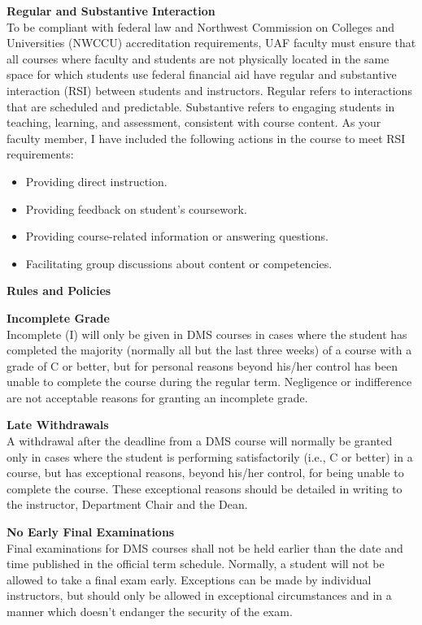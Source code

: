 \documentclass[12pt]{article}
\renewcommand{\emph}[1]{\textsf{\textbf{#1}}}
\newcommand{\localhead}[1]{\par\smallskip\textbf{#1} \smallskip\nobreak\\}%
\def\heading#1{\localhead{\large\emph{#1}}}
\def\subheading#1{\localhead{\emph{#1}}}
\begin{document}
\subheading{Regular and Substantive Interaction}
To be compliant with federal law and Northwest Commission on Colleges and Universities (NWCCU) accreditation requirements, UAF faculty must ensure that all courses where faculty and students are not physically located in the same space for which students use federal financial aid have regular and substantive interaction (RSI) between students and instructors. Regular refers to interactions that are scheduled and predictable. Substantive refers to engaging students in teaching, learning, and assessment, consistent with course content. As your faculty member, I have included the following actions in the course to meet RSI requirements:
\begin{itemize}
\item Providing direct instruction.
\item Providing feedback on student’s coursework.
\item Providing course-related information or answering questions.
\item Facilitating group discussions about content or competencies.
\end{itemize}

\small
\heading{Rules and Policies}
\vskip -20pt

\subheading{Incomplete Grade} 
Incomplete (I) will only be given in
  DMS courses in cases where
  the student has completed the majority (normally all but the last
  three weeks) of a course with a grade of C or better, but for
  personal reasons beyond his/her control has been unable to complete
  the course during the regular term. Negligence or indifference are
  not acceptable reasons for granting an incomplete grade.

\subheading{Late Withdrawals} 
A withdrawal after the deadline from a DMS course will
  normally be granted only in cases where the student is performing
  satisfactorily (i.e., C or better) in a course, but has exceptional
  reasons, beyond his/her control, for being unable to complete the
  course.  These exceptional reasons should be detailed in writing to
  the instructor, Department Chair and the Dean.

\subheading{No Early Final Examinations}
Final examinations for DMS courses shall not be held earlier than the date and time published in the official term schedule.  Normally, a student will not be allowed to take a final exam early.  Exceptions can be made by individual instructors, but should only be allowed in exceptional circumstances and in a manner which doesn't endanger the security of the exam.
\end{document}
